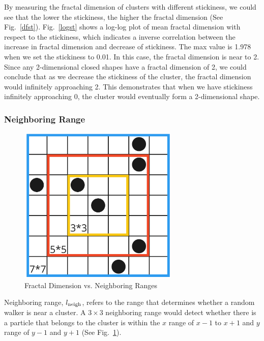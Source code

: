\documentclass[aps,preprint,groupedaddress,letterpaper]{revtex4-1}
\begin{document}
By measuring the fractal dimension of clusters with different stickiness, we could see that the lower the stickiness, the higher the fractal dimension (See Fig.~\ref{dfst}). Fig.~\ref{logst} shows a log-log plot of mean fractal dimension with respect to the stickiness, which indicates a inverse correlation between the increase in fractal dimension and decrease of stickiness. The max value is 1.978 when we set the stickiness to 0.01. In this case, the fractal dimension is near to 2. Since any 2-dimensional closed shapes have a fractal dimension of 2, we could conclude that as we decrease the stickiness of the cluster, the fractal dimension would infinitely approaching 2. This demonstrates that when we have stickiness infinitely approaching 0, the cluster would eventually form a 2-dimensional shape.

\subsubsection{Neighboring Range}

\begin{figure}[h]
\centering
\includegraphics[width=3in]{img/Neighbor/intro.jpg}
\caption{Fractal Dimension vs. Neighboring Ranges
\label{neiintro}}
\end{figure}

Neighboring range, $l_{\rm neigh}$, refers to the range that determines whether a random walker is near a cluster. A $3\times3$ neighboring range would detect whether there is a particle that belongs to the cluster is within the $x$ range of $x-1$ to $x+1$ and $y$ range of $y-1$ and $y + 1$ (See Fig.~\ref{neiintro}).
\end{document}
